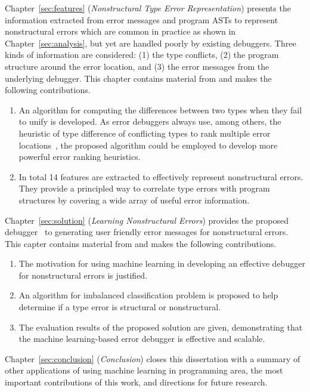 \documentclass[12pt]{report}	%
\begin{document}
Chapter~\ref{sec:features} (\emph{Nonstructural Type Error Representation}) presents the information extracted from error messages and program ASTs 
to represent nonstructural errors which are common in practice as shown in Chapter~\ref{sec:analysis}, but yet are handled poorly by existing debuggers.
Three kinds of information are considered: (1) the type conflicts, (2) the program structure around the error location,
and (3) the error messages from the underlying debugger.
This chapter contains material from \cite{wu2017learning} and makes the following contributions.

\begin{enumerate}
\item An algorithm for computing the differences between two types when they fail to unify is developed.
As error debuggers always use, among others, the heuristic of type difference of conflicting types to rank multiple error locations~\cite{Chen14:CFT,Hage07:HTE},
the proposed algorithm could be employed to develop more powerful error ranking heuristics.

\item In total 14 features are extracted to effectively represent nonstructural errors.
They provide a principled way to correlate type errors with program structures by covering a wide array of useful error information.
\end{enumerate}

Chapter~\ref{sec:solution} (\emph{Learning Nonstructural Errors}) provides the proposed debugger \newCompiler\ 
to generating user friendly error messages for nonstructural errors.
This capter contains material from \cite{wu2017learning} and makes the following contributions.

\begin{enumerate}
\item The motivation for using machine learning in developing an effective debugger for nonstructural errors is justified.

\item An algorithm for imbalanced classification problem is proposed to help determine if a type error is structural or nonstructural.

\item The evaluation results of the proposed solution are given, demonstrating that the machine learning-based error debugger is effective and scalable.
\end{enumerate}

Chapter~\ref{sec:conclusion} (\emph{Conclusion}) closes this dissertation with a summary of other applications of using machine learning in programming area,
the most important contributions of this work, and directions for future research.
\end{document}
